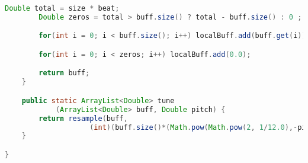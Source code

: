 \documentclass[a4paper]{article}
\begin{document}
\begin{lstlisting}[language=Java]
        Double total = size * beat;
        Double zeros = total > buff.size() ? total - buff.size() : 0 ;

        for(int i = 0; i < buff.size(); i++) localBuff.add(buff.get(i));

        for(int i = 0; i < zeros; i++) localBuff.add(0.0);

        return buff;
    }

    public static ArrayList<Double> tune
            (ArrayList<Double> buff, Double pitch) {
        return resample(buff, 
                    (int)(buff.size()*(Math.pow(Math.pow(2, 1/12.0),-pitch))));
    }

}



\end{lstlisting}
\end{document}
